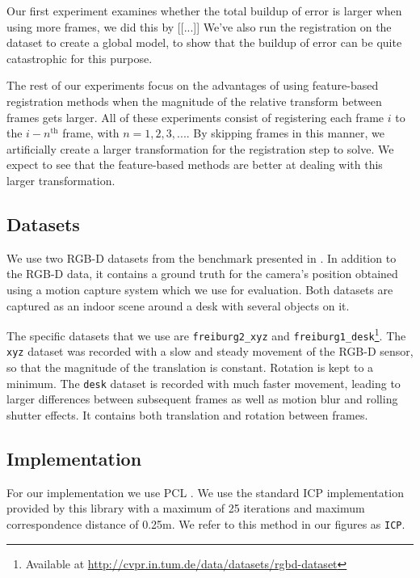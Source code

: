 \documentclass[a4paper]{article}
\begin{document}
Our first experiment examines whether the total buildup of error is larger when using more frames, we did this by [[...]] We've also run the registration on the dataset to create a global model, to show that the buildup of error can be quite catastrophic for this purpose.

The rest of our experiments focus on the advantages of using feature-based registration methods when the magnitude of the relative transform between frames gets larger. All of these experiments consist of registering each frame $i$ to the $i-n^{\mathrm{th}}$ frame, with $n = 1,2,3,...$. By skipping frames in this manner, we artificially create a larger transformation for the registration step to solve. We expect to see that the feature-based methods are better at dealing with this larger transformation.

\subsection{Datasets}

We use two RGB-D datasets from the benchmark presented in \cite{sturm11rss-rgbd}. In addition to the RGB-D data, it contains a ground truth for the camera's position obtained using a motion capture system which we use for evaluation. Both datasets are captured as an indoor scene around a desk with several objects on it.

The specific datasets that we use are \texttt{freiburg2\_xyz} and \texttt{freiburg1\_desk}\footnote{Available at \url{http://cvpr.in.tum.de/data/datasets/rgbd-dataset}}. The \texttt{xyz} dataset was recorded with a slow and steady movement of the RGB-D sensor, so that the magnitude of the translation is constant. Rotation is kept to a minimum. The \texttt{desk} dataset is recorded with much faster movement, leading to larger differences between subsequent frames as well as motion blur and rolling shutter effects. It contains both translation and rotation between frames.

\subsection{Implementation}

For our implementation we use \ac{PCL} \cite{Rusu_ICRA2011_PCL}. We use the standard \ac{ICP} implementation provided by this library with a maximum of 25 iterations and maximum correspondence distance of 0.25m. We refer to this method in our figures as \texttt{ICP}.
\end{document}
